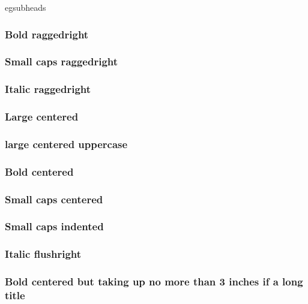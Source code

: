 \FloatBlock


\begin{egresult}{egsubheads}
\setsubsubsecheadstyle{\bfseries\raggedright}
\subsubsection*{Bold raggedright}

\setsubsubsecheadstyle{\scshape\raggedright}
\subsubsection*{Small caps raggedright}

\setsubsubsecheadstyle{\itshape\raggedright}
\subsubsection*{Italic raggedright}

\setsubsubsecheadstyle{\Large\centering}
\subsubsection*{Large centered}

\setsubsubsecheadstyle{\large\centering\MakeUppercase}
\subsubsection*{large centered uppercase}

\setsubsubsecheadstyle{\bfseries\centering}
\subsubsection*{Bold centered}

\setsubsubsecheadstyle{\scshape\centering}
\subsubsection*{Small caps centered}

\setsubsubsecheadstyle{\scshape\raggedright}
\subsubsection*{Small caps indented}

\setsubsubsecindent{0pt}
\setsubsubsecheadstyle{\itshape\raggedleft}
\subsubsection*{Italic flushright}

\setsubsubsecheadstyle{\shortcenter}
\subsubsection*{Bold centered but taking up no more than 3 inches
                if a long title}
\end{egresult}

